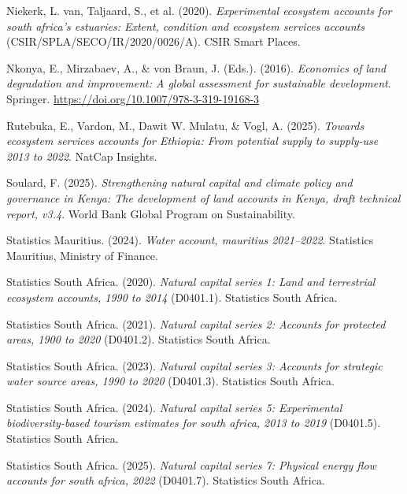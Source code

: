 \documentclass[
  letterpaper,
  DIV=11,
  numbers=noendperiod]{scrartcl}
\newlength{\cslhangindent}
\newenvironment{CSLReferences}[2] %
 {\begin{list}{}{%
  \setlength{\itemindent}{0pt}
  \setlength{\leftmargin}{0pt}
  \setlength{\parsep}{0pt}
  \ifodd #1
   \setlength{\leftmargin}{\cslhangindent}
   \setlength{\itemindent}{-1\cslhangindent}
  \fi
  \setlength{\itemsep}{#2\baselineskip}}}
 {\end{list}}
\begin{document}
\begin{CSLReferences}{1}{0}
{Niekerk, L. van, Taljaard, S., et al.} (2020). \emph{Experimental
ecosystem accounts for south africa's estuaries: Extent, condition and
ecosystem services accounts} (CSIR/SPLA/SECO/IR/2020/0026/A). CSIR Smart
Places.

{Nkonya, E., Mirzabaev, A., \& von Braun, J. (Eds.)}. (2016).
\emph{Economics of land degradation and improvement: {A} global
assessment for sustainable development}. Springer.
\url{https://doi.org/10.1007/978-3-319-19168-3}

Rutebuka, E., Vardon, M., Dawit W. Mulatu, \& Vogl, A. (2025).
\emph{Towards ecosystem services accounts for {Ethiopia}: From potential
supply to supply-use 2013 to 2022}. NatCap Insights.

Soulard, F. (2025). \emph{Strengthening natural capital and climate
policy and governance in {Kenya}: The development of land accounts in
{Kenya}, draft technical report, v3.4}. World Bank Global Program on
Sustainability.

Statistics Mauritius. (2024). \emph{Water account, mauritius
2021--2022}. Statistics Mauritius, Ministry of Finance.

Statistics South Africa. (2020). \emph{Natural capital series 1: Land
and terrestrial ecosystem accounts, 1990 to 2014} (D0401.1). Statistics
South Africa.

Statistics South Africa. (2021). \emph{Natural capital series 2:
Accounts for protected areas, 1900 to 2020} (D0401.2). Statistics South
Africa.

Statistics South Africa. (2023). \emph{Natural capital series 3:
Accounts for strategic water source areas, 1990 to 2020} (D0401.3).
Statistics South Africa.

Statistics South Africa. (2024). \emph{Natural capital series 5:
Experimental biodiversity-based tourism estimates for south africa, 2013
to 2019} (D0401.5). Statistics South Africa.

Statistics South Africa. (2025). \emph{Natural capital series 7:
Physical energy flow accounts for south africa, 2022} (D0401.7).
Statistics South Africa.


\end{CSLReferences}
\end{document}
